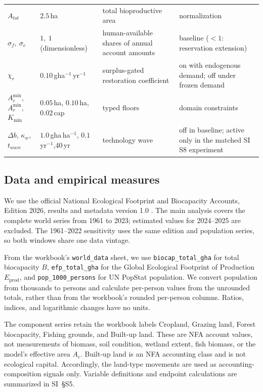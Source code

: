 \documentclass[preprint,12pt,authoryear]{elsarticle}
\newcommand{\Acmin}{A_c^{\min}}
\begin{document}
\begin{table}[!htbp]
\begin{tabularx}{\textwidth}{@{}>{\raggedright\arraybackslash}p{} >{\raggedright\arraybackslash}p{} >{\raggedright\arraybackslash}X >{\raggedright\arraybackslash}p{}@{}}
$A_{tot}$ & $2.5$\,ha & total bioproductive area & normalization \\
$\sigma_f,\ \sigma_c$ & $1,\ 1$ (dimensionless) & human-available shares of annual account amounts & baseline ($<1$: reservation extension) \\
$\chi_r$ & $0.10$\,gha$^{-1}$\,yr$^{-1}$ & surplus-gated restoration coefficient & on with endogenous demand; off under frozen demand \\
$\Acmin$, $A_r^{\min}$,\newline $K_{\min}$ & $0.05$\,ha, $0.10$\,ha,\newline $0.02$\,cap & typed floors & domain constraints \\
$\Delta b$, $\kappa_w$,\newline $t_{wave}$ & $1.0$\,gha\,ha$^{-1}$, $0.1$\,yr$^{-1}$,\newline $40$\,yr & technology wave & off in baseline; active only in the matched SI S8 experiment \\
\bottomrule
\end{tabularx}
\end{table}

\subsection{Data and empirical measures}\label{sec:data}

We use the official National Ecological Footprint and Biocapacity Accounts, Edition 2026, results and metadata version 1.0 \citep{Lo2026NFA}. The main analysis covers the complete world series from 1961 to 2023; estimated values for 2024--2025 are excluded. The 1961--2022 sensitivity uses the same edition and population series, so both windows share one data vintage.

From the workbook's \texttt{world\_data} sheet, we use \texttt{biocap\_total\_gha} for total biocapacity $B$, \texttt{efp\_total\_gha} for the Global Ecological Footprint of Production $E_{\mathrm{prod}}$, and \texttt{pop\_1000\_persons} for UN PopStat population. We convert population from thousands to persons and calculate per-person values from the unrounded totals, rather than from the workbook's rounded per-person columns. Ratios, indices, and logarithmic changes have no units.

The component series retain the workbook labels Cropland, Grazing land, Forest biocapacity, Fishing grounds, and Built-up land. These are NFA account values, not measurements of biomass, soil condition, wetland extent, fish biomass, or the model's effective area $A_c$. Built-up land is an NFA accounting class and is not ecological capital. Accordingly, the land-type movements are used as accounting-composition signals only. Variable definitions and endpoint calculations are summarized in SI~\S S5.
\end{document}
